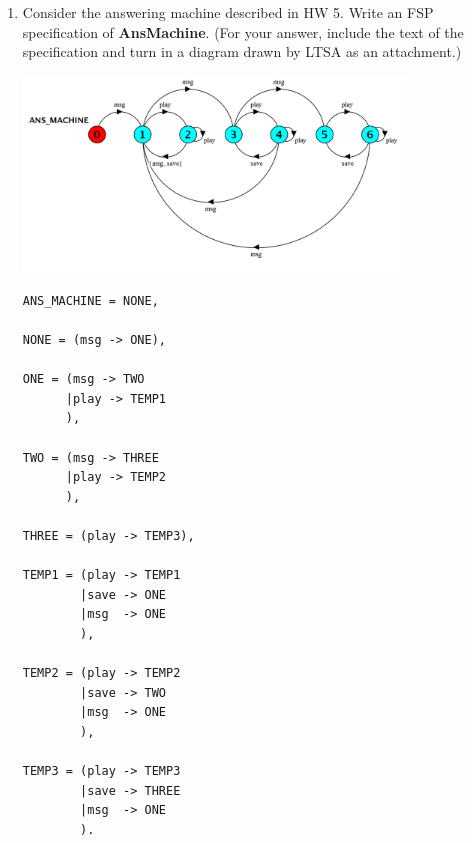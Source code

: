 \documentclass{article}
\begin{document}

\begin{enumerate}[1.]


\item Consider the answering machine described in HW 5. Write an FSP
specification of {\bf AnsMachine}. (For your answer, include the text of the specification and turn in a diagram drawn by LTSA as an
attachment.)

\includegraphics[width=4in]{ans_machine.png}

\begin{verbatim}
ANS_MACHINE = NONE,

NONE = (msg -> ONE),

ONE = (msg -> TWO
      |play -> TEMP1
      ),

TWO = (msg -> THREE
      |play -> TEMP2
      ),

THREE = (play -> TEMP3),

TEMP1 = (play -> TEMP1
        |save -> ONE
        |msg  -> ONE
        ),

TEMP2 = (play -> TEMP2
        |save -> TWO
        |msg  -> ONE
        ),

TEMP3 = (play -> TEMP3
        |save -> THREE
        |msg  -> ONE
        ).
\end{verbatim}


%
%
%


\end{enumerate}
\end{document}
